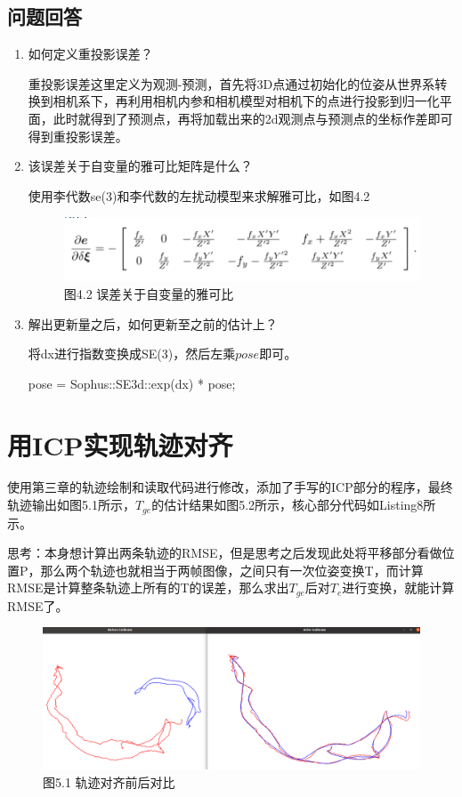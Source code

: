 \documentclass[40pt,a4paper，UTF8]{ctexart}
\numberwithin{equation}{section}
\begin{document}
\subsection{问题回答}
\begin{enumerate}
\item 如何定义重投影误差？

重投影误差这里定义为观测-预测，首先将3D点通过初始化的位姿从世界系转换到相机系下，再利用相机内参和相机模型对相机下的点进行投影到归一化平面，此时就得到了预测点，再将加载出来的2d观测点与预测点的坐标作差即可得到重投影误差。

\item 该误差关于自变量的雅可比矩阵是什么？

使用李代数se(3)和李代数的左扰动模型来求解雅可比，如图4.2
\begin{figure}[H]
\centering
\includegraphics[scale=0.5]{ch5_4_2.png} {\\图4.2 误差关于自变量的雅可比}
\end{figure}

\item 解出更新量之后，如何更新至之前的估计上？

将dx进行指数变换成SE(3)，然后左乘$pose$即可。

pose = Sophus::SE3d::exp(dx) * pose;

\end{enumerate}


\section{用ICP实现轨迹对齐}
使用第三章的轨迹绘制和读取代码进行修改，添加了手写的ICP部分的程序，最终轨迹输出如图5.1所示，$T_{ge}$的估计结果如图5.2所示，核心部分代码如Listing8所示。

思考：本身想计算出两条轨迹的RMSE，但是思考之后发现此处将平移部分看做位置P，那么两个轨迹也就相当于两帧图像，之间只有一次位姿变换T，而计算RMSE是计算整条轨迹上所有的T的误差，那么求出$T_{ge}$后对$T_e$进行变换，就能计算RMSE了。

\begin{figure}[H]
\centering
\includegraphics[scale=0.3]{ch5_5_1.png} {\\图5.1 轨迹对齐前后对比}
\end{figure}
\end{document}
